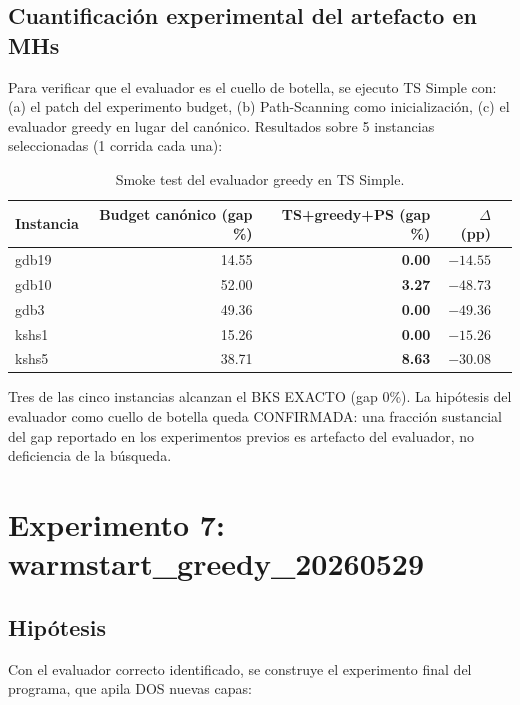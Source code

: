 \documentclass[11pt,a4paper]{article}
\theoremstyle{definition}
\theoremstyle{remark}
\begin{document}
\subsection{Cuantificación experimental del artefacto en MHs}

Para verificar que el evaluador es el cuello de botella, se ejecuto
TS Simple con: (a) el patch del experimento budget, (b) Path-Scanning
como inicialización, (c) el evaluador greedy en lugar del canónico.
Resultados sobre 5 instancias seleccionadas (1 corrida cada una):

\begin{table}[h]
\centering
\caption{Smoke test del evaluador greedy en TS Simple.}
\label{tab:smoke-greedy-ts}
\small
\begin{tabular}{lrrrr}
\toprule
Instancia & Budget canónico (gap \%) & TS+greedy+PS (gap \%) & $\Delta$ (pp) \\
\midrule
gdb19 & 14.55 & \textbf{0.00} & $-14.55$ \\
gdb10 & 52.00 & \textbf{3.27} & $-48.73$ \\
gdb3  & 49.36 & \textbf{0.00} & $-49.36$ \\
kshs1 & 15.26 & \textbf{0.00} & $-15.26$ \\
kshs5 & 38.71 & \textbf{8.63} & $-30.08$ \\
\bottomrule
\end{tabular}
\end{table}

Tres de las cinco instancias alcanzan el BKS EXACTO (gap 0\%). La
hipótesis del evaluador como cuello de botella queda CONFIRMADA: una
fracción sustancial del gap reportado en los experimentos previos es
artefacto del evaluador, no deficiencia de la búsqueda.

\section{Experimento 7: warmstart\_greedy\_20260529}
\label{sec:warmstart-greedy}

\subsection{Hipótesis}

Con el evaluador correcto identificado, se construye el experimento
final del programa, que apila DOS nuevas capas:
\end{document}
